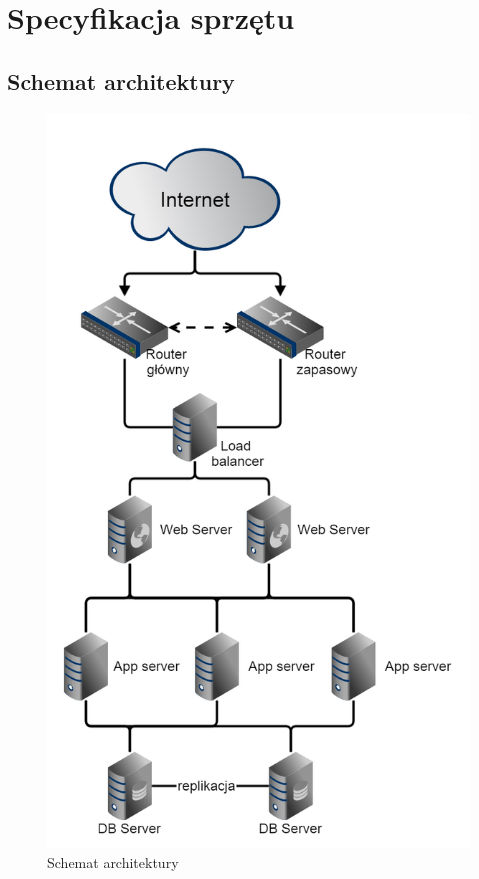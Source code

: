\section{Specyfikacja sprzętu}

\subsection{Schemat architektury}

\begin{figure}[H]
	\centering
	\includegraphics[height=0.8\textheight]{img/architektura}
	\caption{Schemat architektury \label{fig:labelArchitecture}}
\end{figure}


